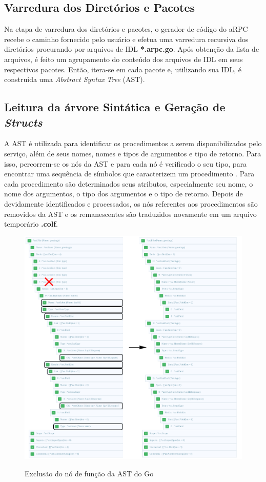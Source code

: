 \subsection{Varredura dos Diretórios e Pacotes}

Na etapa de varredura dos diretórios e pacotes, o gerador de código do aRPC recebe o caminho fornecido pelo usuário e efetua uma varredura recursiva dos diretórios procurando por arquivos de IDL \textbf{*.arpc.go}. Após obtenção da lista de arquivos, é feito um agrupamento do conteúdo dos arquivos de IDL em seus respectivos pacotes. Então, itera-se em cada pacote e, utilizando sua IDL, é construida uma \textit{Abstract Syntax Tree} (AST).

\subsection{Leitura da árvore Sintática e Geração de \textit{Structs}}

A AST é utilizada para identificar os procedimentos a serem disponibilizados pelo serviço, além de seus nomes, nomes e tipos de argumentos e tipo de retorno. Para isso, percorrem-se os nós da AST e para cada nó é verificado o seu tipo, para encontrar uma sequência de símbolos que caracterizem um procedimento \cite{zaytsev_parsing_2014}. Para cada procedimento são determinados seus atributos, especialmente seu nome, o nome dos argumentos, o tipo dos argumentos e o tipo de retorno. Depois de devidamente identificados e processados, os nós referentes aos procedimentos são removidos da AST e os remanescentes são traduzidos novamente em um arquivo temporário \textbf{.colf}.

\begin{figure}[ht]
    \centering
    \caption{Exclusão do nó de função da AST do Go}
    \includegraphics[width=\textwidth]{figuras/diagramas/cap3/ast.png}
    \label{fig:arpc_ast_function_removal}
\end{figure}


